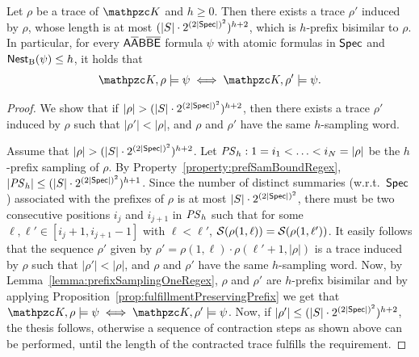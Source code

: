 \begin{theorem}\label{theorem:singleExpTrackModelRegex}
Let $\rho$ be a trace of $\Ku$ and $h\geq 0$.
Then there exists a trace $\rho'$ induced by $\rho$, whose length is at most $(|S|\cdot 2^{(2|\textsf{Spec}|)^2})^{h+2}$, which is $h$-prefix bisimilar to $\rho$. In particular,  for every $\mathsf{A\overline{A}B\overline{B}\overline{E}}$ formula $\psi$ with atomic formulas in $\textsf{Spec}$ and $\operatorname{\mathsf{Nest}_B}(\psi)\leq h$, it holds that \[\Ku,\rho\models \psi\iff \Ku,\rho'\models \psi.\]
\end{theorem}
\begin{proof} 
We show that if $|\rho|>(|S|\cdot 2^{(2|\SPEC|)^2})^{h+2}$, then there exists a trace $\rho'$ induced by $\rho$ such that $|\rho'|<|\rho|$,
 and $\rho$ and $\rho'$ have the same $h$-sampling word. 
 
 Assume that $|\rho|>(|S|\cdot 2^{(2|\SPEC|)^2})^{h+2}$.
 Let ${\mathit{PS}}_{h}: 1=i_1<\ldots <i_N=|\rho|$ be the $h$-prefix sampling of $\rho$. By Property~\ref{property:prefSamBoundRegex}, $|{\mathit{PS}}_{h}|\leq (|S|\cdot 2^{(2|\textsf{Spec}|)^2})^{h+1}$.
  Since  the number of distinct summaries (w.r.t.\ $\textsf{Spec}$) associated with the prefixes of $\rho$ is at most $|S|\cdot 2^{(2|\textsf{Spec}|)^2}$, there must be two consecutive positions $i_j$ and
  $i_{j+1}$ in ${\mathit{PS}}_h$ such that for some $\ell,\ell'\in [i_j+1,i_{j+1}-1]$ with $\ell<\ell'$, $\mathcal{S}(\rho(1,\ell))=\mathcal{S}(\rho(1,\ell'))$. It easily follows that
  the sequence $\rho'$ given by $\rho'=\rho(1,\ell)\cdot \rho(\ell'+1,|\rho|)$ is a trace induced by $\rho$ such that $|\rho'|<|\rho|$, and $\rho$ and $\rho'$ have the same
  $h$-sampling word.
  Now, by Lemma~\ref{lemma:prefixSamplingOneRegex}, $\rho$ and $\rho'$ are $h$-prefix bisimilar and by applying Proposition~\ref{prop:fulfillmentPreservingPrefix} we get that $\Ku,\rho\models \psi\iff \Ku,\rho'\models \psi$.
  Now, if $|\rho'|\leq (|S|\cdot 2^{(2|\textsf{Spec}|)^2})^{h+2}$, the thesis follows, otherwise a sequence of contraction steps as shown above can be performed, until the length of the contracted trace fulfills the requirement.
\end{proof}